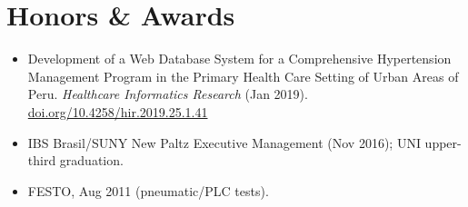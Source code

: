 \section{Honors \& Awards}

\begin{itemize}
  \item {} Development of a Web Database System for a Comprehensive Hypertension Management Program in the Primary Health Care Setting of Urban Areas of Peru. \textit{Healthcare Informatics Research} (Jan 2019). \href{https://doi.org/10.4258/hir.2019.25.1.41}{doi.org/10.4258/hir.2019.25.1.41}
  \item {} IBS Brasil/SUNY New Paltz Executive Management (Nov 2016); UNI upper-third graduation.
  \item {} FESTO, Aug 2011 (pneumatic/PLC tests).
\end{itemize}
